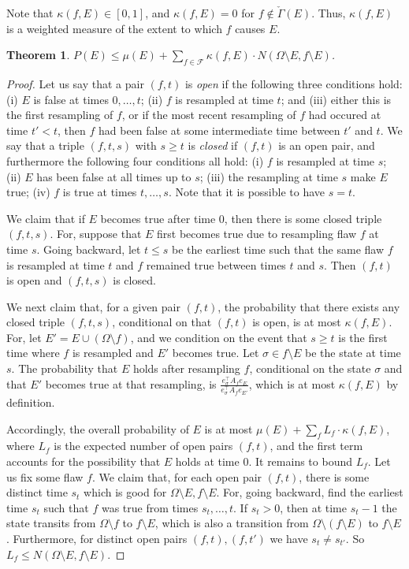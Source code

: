 \documentclass[11pt]{article}
\newtheorem{theorem}{Theorem}[section]
\begin{document}
Note that $\kappa(f, E) \in [0,1]$, and $\kappa(f,E) = 0$ for $f \notin \check \Gamma(E)$. Thus, $\kappa(f, E)$ is a weighted measure of the extent to which $f$ causes $E$.  



\begin{theorem}
\label{distthm1e} 
$P(E) \leq \mu(E) +  \sum_{f \in \mathcal F}  \kappa(f, E) \cdot N (\Omega \setminus E, f \setminus E)$.
\end{theorem}

\begin{proof}
Let us say that a pair $(f,t)$ is \emph{open} if the following three conditions hold: (i) $E$ is false at times $0, \dots, t$; (ii) $f$ is resampled at time $t$; and (iii) either this is the first resampling of $f$, or if the most recent resampling of $f$ had occured at time $t' < t$, then $f$ had been false at some intermediate time between $t'$ and $t$.  We say that a triple $(f,t,s)$ with $s \geq t$ is \emph{closed} if $(f,t)$ is an open pair, and furthermore the following four conditions  all hold: (i) $f$ is resampled at time $s$; (ii) $E$ has been false at all times up to $s$; (iii) the resampling at time $s$ make $E$ true; (iv) $f$ is true at times $t, \dots, s$. Note that it is possible to have $s = t$.

We claim that if $E$ becomes true after time 0, then there is some closed triple $(f,t,s)$. For, suppose that $E$ first becomes true due to resampling flaw $f$ at time $s$. Going backward, let $t \leq s$ be the earliest time such that the same flaw $f$ is resampled at time $t$ and $f$ remained true between times $t$ and $s$. Then $(f,t)$ is open and $(f,t,s)$ is closed.

We next claim that, for a given pair $(f,t)$, the probability that there exists any closed triple $(f,t,s)$, conditional on that $(f,t)$ is open, is at most $\kappa(f,E)$. For, let $E' = E \cup (\Omega \setminus f)$, and we condition on the event that $s \geq t$ is the first time where  $f$ is resampled and $E'$ becomes true. Let $\sigma \in f \setminus E$ be the state at time $s$. The probability that $E$ holds after resampling $f$, conditional on the state $\sigma$ and that $E'$ becomes true at that resampling,  is $\frac{ e_{\sigma}^{\top} A_f e_{E}  }{e_{\sigma}^{\top} A_f e_{E'}}$, which is at most $\kappa(f,E)$ by definition.

Accordingly, the overall probability of  $E$ is at most $\mu(E) + \sum_f L_f \cdot \kappa(f, E)$, where $L_f$ is the expected number of open pairs $(f,t)$, and the first term accounts for the possibility that $E$ holds at time 0. It remains to bound $L_f$. Let us fix some flaw $f$. We claim that, for each open pair $(f,t)$, there is some distinct time $s_t$ which is good for $\Omega \setminus E,  f \setminus E$. For, going backward, find the earliest time $s_t$ such that $f$ was true from times $s_t, \dots, t$.  If $s_t > 0$, then at time $s_t - 1$ the state transits from $\Omega \setminus f$ to $f \setminus E$, which is also a transition from $\Omega \setminus (f \setminus E)$ to $f \setminus E$. Furthermore, for distinct open pairs $(f,t), (f,t')$ we have $s_t \neq s_{t'}$. So  $L_f \leq N(\Omega \setminus E, f \setminus E)$.
\end{proof}
\end{document}
